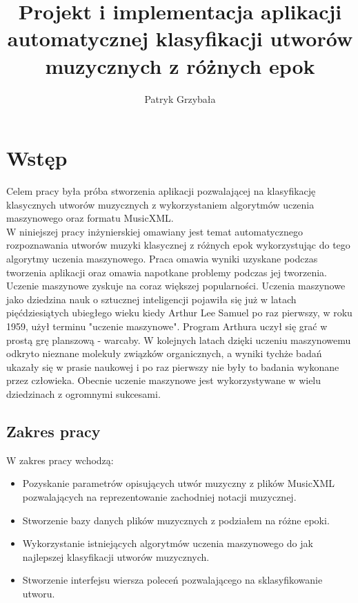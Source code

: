 \documentclass[printmode, eng, openany]{mgr}
\title{Projekt i implementacja aplikacji automatycznej klasyfikacji utworów muzycznych z różnych epok}
\author{Patryk Grzybała}
\newcommand\tab[1][1cm]{\hspace*{#1}}
\begin{document}
\maketitle

\tableofcontents

\chapter{Wstęp}
\tab Celem pracy była próba stworzenia aplikacji pozwalającej na klasyfikację klasycznych utworów muzycznych z wykorzystaniem algorytmów uczenia maszynowego oraz formatu MusicXML.\\
\tab W niniejszej pracy inżynierskiej omawiany jest temat automatycznego rozpoznawania utworów muzyki klasycznej z różnych epok wykorzystując do tego algorytmy uczenia maszynowego. Praca omawia wyniki uzyskane podczas tworzenia aplikacji oraz omawia napotkane problemy podczas jej tworzenia. \\

\tab Uczenie maszynowe zyskuje na coraz większej popularności. Uczenia maszynowe jako dziedzina nauk o sztucznej inteligencji pojawiła się już w latach pięćdziesiątych ubiegłego wieku kiedy Arthur Lee Samuel po raz pierwszy, w roku 1959, użył terminu "uczenie maszynowe". Program Arthura uczył się grać w prostą grę planszową - warcaby. W kolejnych latach dzięki uczeniu maszynowemu odkryto nieznane molekuły związków organicznych, a wyniki tychże badań ukazały się w prasie naukowej i po raz pierwszy nie były to badania wykonane przez człowieka. Obecnie uczenie maszynowe jest wykorzystywane w wielu dziedzinach z ogromnymi sukcesami.
\section{Zakres pracy}
\tab W zakres pracy wchodzą:
\begin{itemize}
\item Pozyskanie parametrów opisujących utwór muzyczny z plików MusicXML pozwalających na reprezentowanie zachodniej notacji muzycznej.
\item Stworzenie bazy danych plików muzycznych z podziałem na różne epoki.
\item Wykorzystanie istniejących algorytmów uczenia maszynowego do jak najlepszej klasyfikacji utworów muzycznych.
\item Stworzenie interfejsu wiersza poleceń pozwalającego na sklasyfikowanie utworu.
\end{itemize}
\end{document}
